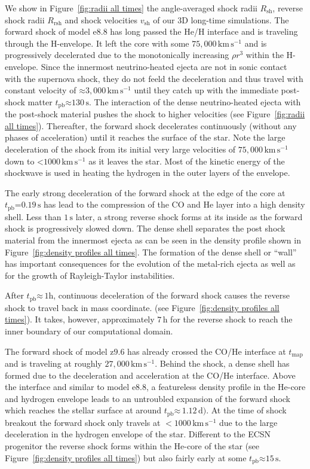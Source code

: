 \documentclass[fleqn,usenatbib]{mnras}
\newcommand{\tpb}{\ensuremath{t_{\text{pb}}}}
\newcommand{\kms}{\ensuremath{\mathrm{km\, s^{-1}}}}
\newcommand{\s}{\ensuremath{\text{s}}}
\newcommand{\onemg}{\ensuremath{\mathrm{e8.8}}\xspace}
\newcommand{\znine}{\ensuremath{\mathrm{z9.6}}\xspace}
\begin{document}
We show in Figure~\ref{fig:radii all times} the angle-averaged shock radii $R_{\mathrm{sh}}$, reverse shock radii $R_{\mathrm{rsh}}$ and shock velocities $v_{\mathrm{sh}}$ of our 3D long-time simulations.
The forward shock of model \onemg has long passed the He/H interface and is traveling through the H-envelope.
It left the core with some $75,000\,\kms$ and is progressively decelerated 
due to the monotonically increasing $\rho r^3$ within the H-envelope. 
Since the innermost neutrino-heated ejecta are not in sonic contact with the 
supernova shock, they do not feeld the deceleration and thus travel with constant velocity of $\mathord{\approx}3,000\,\kms$ until they catch up with the immediate post-shock matter $\tpb\mathord{\approx}130\,\s$.
The interaction of the dense neutrino-heated ejecta with the post-shock material pushes the shock to higher velocities (see Figure~\ref{fig:radii all times}).
Thereafter, the forward shock decelerates continuously (without any phases
of acceleration) until it reaches the surface of the star. Note the large deceleration of the shock from its 
initial very large velocities of $75,000\,\kms$
down to $\mathord{<}1000\,\kms$ as it leaves the star. Most of the kinetic energy of the shockwave is used in
heating the hydrogen in the outer layers of the envelope.

The early strong deceleration of the forward shock at the edge of the core at $\tpb\mathord{=}0.19\,\text{s}$ has
lead to the compression of the CO and He layer into a high density shell. Less than $1\,\s$ later, a strong
reverse shock forms at its inside as the forward shock is progressively slowed down.
The dense shell separates the post shock material from the innermost ejecta as can be seen
in the density profile shown in Figure~\ref{fig:density profiles all times}. The formation of the dense shell or ``wall'' 
\cite{Kifonidis2006} has important consequences for the evolution of the metal-rich ejecta as well as for the growth
of Rayleigh-Taylor instabilities.

After $\tpb\mathord{\approx}\,1\text{h}$, continuous deceleration of the forward
shock causes the reverse shock to travel back in mass coordinate.
(see Figure~\ref{fig:density profiles all times}). It takes, however, approximately
$7\,\text{h}$ for the reverse shock to reach the inner boundary of our computational domain. 

The forward shock of model \znine has already crossed the CO/He interface at $t_{\mathrm{map}}$
and is traveling at roughly $27,000\,\kms$. 
Behind the shock, a dense shell has formed due to the deceleration
and acceleration at the CO/He interface.
Above the interface and similar to model \onemg, 
a featureless density profile in the He-core and hydrogen envelope leads to an 
untroubled expansion of the forward shock which reaches 
the stellar surface at around $\tpb\mathord{\approx}\,1.12\,\mathrm{d})$. 
At the time of shock breakout the forward shock only travels at $<1000\,\kms$ due to
the large deceleration in the hydrogen envelope of the star. 
Different to the ECSN progenitor the reverse shock forms within the He-core of the star
(see Figure~\ref{fig:density profiles all times}) but also fairly early at some $\tpb \mathord{\approx} 15\,\s$.
\end{document}
